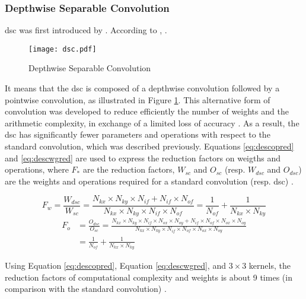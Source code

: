 \subsubsection{Depthwise Separable Convolution}  \label{subs:dsc}
\acrfull{dsc} was first introduced by \textcite{sifre_rigid-motion_2014}. According to \textcite{chollet_xception_2017}, .
%
\begin{figure}[H]
    \texttt{[image: dsc.pdf]}
    \caption{Depthwise Separable Convolution}
    \label{fig:dsc}
\end{figure}
%
It means that the \acrshort{dsc} is composed of a depthwise convolution followed by a pointwise convolution, as illustrated in Figure \ref{fig:dsc}. This alternative form of convolution was developed to reduce efficiently the number of weights and the arithmetic complexity, in exchange of a limited loss of accuracy \cite{liu_fpga-based_2019}. As a result, the \acrshort{dsc} has significantly fewer parameters and operations with respect to the standard convolution, which was described previously. Equations \eqref{eq:descopred} and \eqref{eq:descwgred} are used to express the reduction factors on weigths and operations, where $F_{*}$ are the reduction factors, $W_{sc}$ and $O_{sc}$ (resp. $W_{dsc}$ and $O_{dsc}$) are the weights and operations required for a standard convolution (resp. \acrshort{dsc}) \cite{liu_fpga-based_2019, bai_cnn_2018}.

\begin{equation}
    F_w = \frac{W_{dsc}}{W_{sc}} =
    \frac{N_{kx} \times N_{ky} \times N_{if} + N_{if} \times N_{of}}{N_{kx} \times N_{ky} \times N_{if} \times N_{of}} =
    \frac{1}{N_{of}} + \frac{1}{N_{kx} \times N_{ky}}
    \label{eq:descopred}
\end{equation}
%
\begin{equation}
    \begin{split}
        F_o &= \frac{O_{dsc}}{O_{sc}} = \frac{N_{kx} \times N_{ky} \times N_{if} \times N_{ox} \times N_{oy} + N_{if} \times N_{of} \times N_{ox} \times N_{oy}}{N_{kx} \times N_{ky} \times N_{if} \times N_{of} \times N_{ox} \times N_{oy}} \\
        &= \frac{1}{N_{of}} + \frac{1}{N_{kx} \times N_{ky}}
    \end{split}
    \label{eq:descwgred}
\end{equation}

Using Equation \eqref{eq:descopred}, Equation \eqref{eq:descwgred}, and $3 \times 3$ kernels, the reduction factors of computational complexity and weights is about 9 times (in comparison with the standard convolution) \cite{zhang_channel_2019}.